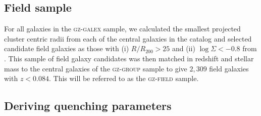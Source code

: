 \documentclass[useAMS,usenatbib]{mn2e}
\begin{document}
\subsection{Field sample}\label{sec:field}

For all galaxies in the \textsc{gz-galex} sample, we calculated the smallest projected cluster centric radii from each of the central galaxies in the  \citet{berlind06} catalog and selected candidate field galaxies as those with (i) $R/R_{200} > 25$ and (ii) $\log\Sigma < -0.8$ from \cite{baldry06}. This sample of field galaxy candidates was then matched in redshift and stellar mass to the central galaxies of the \textsc{gz-group} sample to give $2,309$ field galaxies with $z < 0.084$. This will be referred to as the \textsc{gz-field} sample. 

\subsection{Deriving quenching parameters}\label{sec:starpy}
\end{document}
